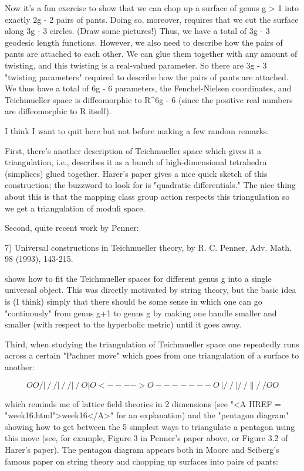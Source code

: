 Now it's a fun exercise to show that we can chop up a surface of genus g
> 1 into exactly 2g - 2 pairs of pants.  Doing so, moreover, requires
that we cut the surface along 3g - 3 circles.  (Draw some pictures!)  
Thus, we have a total of 3g - 3 geodesic length functions.  However, we
also need to describe how the pairs of pants are attached to each other.
We can glue them together with any amount of twisting, and this twisting
is a real-valued parameter.  So there are 3g - 3 "twisting parameters"
required to describe how the pairs of pants are attached.  We thus have
a total of 6g - 6 parameters, the Fenchel-Nielsen coordinates, and
Teichmueller space is diffeomorphic to R^{6g - 6} (since the positive
real numbers are diffeomorphic to R itself).  

I think I want to quit here but not before making a few random remarks.

First, there's another description of Teichmueller space which gives it
a triangulation, i.e., describes it as a bunch of high-dimensional
tetrahedra (simplices) glued together.  Harer's paper gives a nice quick
sketch of this construction; the buzzword to look for is "quadratic
differentials."  The nice thing about this is that the mapping class
group action respects this triangulation so we get a triangulation of
moduli space.  

Second, quite recent work by Penner:

7) Universal constructions in Teichmueller theory, by R. C. Penner, Adv.
Math. 98 (1993), 143-215.

shows how to fit the Teichmueller spaces for different genus g into a
single universal object.  This was directly motivated by string theory,
but the basic idea is (I think) simply that there should be some sense in which
one can go "continously" from genus g+1 to genus g by making one handle
smaller and smaller (with respect to the hyperbolic metric) until it
goes away.  

Third, when studying the triangulation of Teichmueller space one
repeatedly runs across a certain "Pachner move" which goes from one
triangulation of a surface to another:

$$
    O                 O
   /|\               / \    
  / | \             /   \  
 /  |  \           /     \ 
O   |   O <---->  O-------O
 \  |  /           \     /   
  \ | /             \   /          
   \|/               \ /     
    O                 O
$$
    

which reminds me of lattice field theories in 2 dimensions (see "<A HREF = "week16.html">week16</A>"
for an explanation) and the "pentagon diagram" showing how to get
between the 5 simplest ways to triangulate a pentagon using this move
(see, for example, Figure 3 in Penner's paper above, or Figure 3.2 of
Harer's paper).  The pentagon diagram appears both in Moore and
Seiberg's famous paper on string theory and chopping up surfaces into
pairs of pants:

